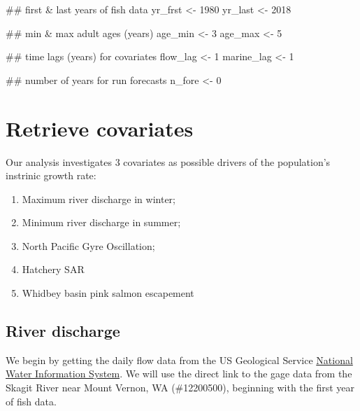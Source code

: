 \documentclass[11pt,]{article}
\newenvironment{Shaded}{}{}
\newcommand{\DecValTok}[1]{#1}
\newcommand{\StringTok}[1]{\textcolor[rgb]{0.00,0.50,0.50}{#1}}
\newcommand{\NormalTok}[1]{#1}
\providecommand{\tightlist}{%
  \setlength{\itemsep}{0pt}\setlength{\parskip}{0pt}}
\begin{document}
\begin{Shaded}
\begin{Highlighting}[]
\NormalTok{## first & last years of fish data}
\NormalTok{yr_frst <-}\StringTok{ }\DecValTok{1980}
\NormalTok{yr_last <-}\StringTok{ }\DecValTok{2018}

\NormalTok{## min & max adult ages (years)}
\NormalTok{age_min <-}\StringTok{ }\DecValTok{3}
\NormalTok{age_max <-}\StringTok{ }\DecValTok{5}

\NormalTok{## time lags (years) for covariates}
\NormalTok{flow_lag <-}\StringTok{ }\DecValTok{1}
\NormalTok{marine_lag <-}\StringTok{ }\DecValTok{1}


\NormalTok{## number of years for run forecasts}
\NormalTok{n_fore <-}\StringTok{ }\DecValTok{0}
\end{Highlighting}
\end{Shaded}

\section{Retrieve covariates}\label{retrieve-covariates}

Our analysis investigates 3 covariates as possible drivers of the
population's instrinic growth rate:

\begin{enumerate}
\def\labelenumi{\arabic{enumi}.}
\tightlist
\item
  Maximum river discharge in winter;
\item
  Minimum river discharge in summer;
\item
  North Pacific Gyre Oscillation;
\item
  Hatchery SAR
\item
  Whidbey basin pink salmon escapement
\end{enumerate}

\subsection{River discharge}\label{river-discharge}

We begin by getting the daily flow data from the US Geological Service
\href{http://waterdata.usgs.gov/nwis}{National Water Information
System}. We will use the direct link to the gage data from the Skagit
River near Mount Vernon, WA (\#12200500), beginning with the first year
of fish data.
\end{document}
